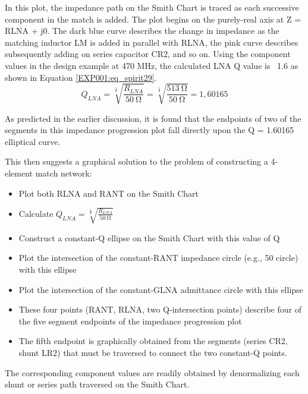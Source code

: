         In this plot, the impedance path on the Smith Chart is traced as each successive component 
        in the match is added. The plot begins on the purely-real axis at Z = RLNA + j0. The dark 
        blue curve describes the change in impedance as the matching inductor LM is added in 
        parallel with RLNA, the pink curve describes subsequently adding on series capacitor CR2, 
        and so on. Using the component values in the design example at 470 MHz, the calculated LNA 
        Q value is ~1.6 as shown in Equation 
        \ref{EXP001:eq_spirit29}.
        \begin{equation}\label{EXP001:eq_spirit29}
          Q_{LNA} = \sqrt[\frac{1}{2}]{\frac{R_{LNA}}{\qty{50}{\ohm}}}
                  = \sqrt[\frac{1}{2}]{\frac{\qty{513}{\ohm}}{\qty{50}{\ohm}}}
                  = 1,60165
        \end{equation}
        
        As predicted in the earlier discussion, it is found that the endpoints of two of the 
        segments in this impedance progression plot fall directly upon the Q = 1.60165 elliptical 
        curve.
        
        This then suggests a graphical solution to the problem of constructing a 4-element match network:
        \begin{itemize}[noitemsep]
          \item Plot both RLNA and RANT on the Smith Chart
          \item Calculate \(Q_{LNA} = \sqrt[\frac{1}{2}]{\frac{R_{LNA}}{\qty{50}{\ohm}}}\)
          \item Construct a constant-Q ellipse on the Smith Chart with this value of Q
          \item Plot the intersection of the constant-RANT impedance circle (e.g., 50 circle) with 
                this ellipse
          \item Plot the intersection of the constant-GLNA admittance circle with this ellipse
          \item These four points (RANT, RLNA, two Q-intersection points) describe four of the 
                five segment endpoints of the impedance progression plot
          \item The fifth endpoint is graphically obtained from the segments (series CR2, shunt  
                LR2) that must be traversed to connect the two constant-Q points.
        \end{itemize}
        The corresponding component values are readily obtained by denormalizing each shunt or series path 
        traversed on the Smith Chart.

